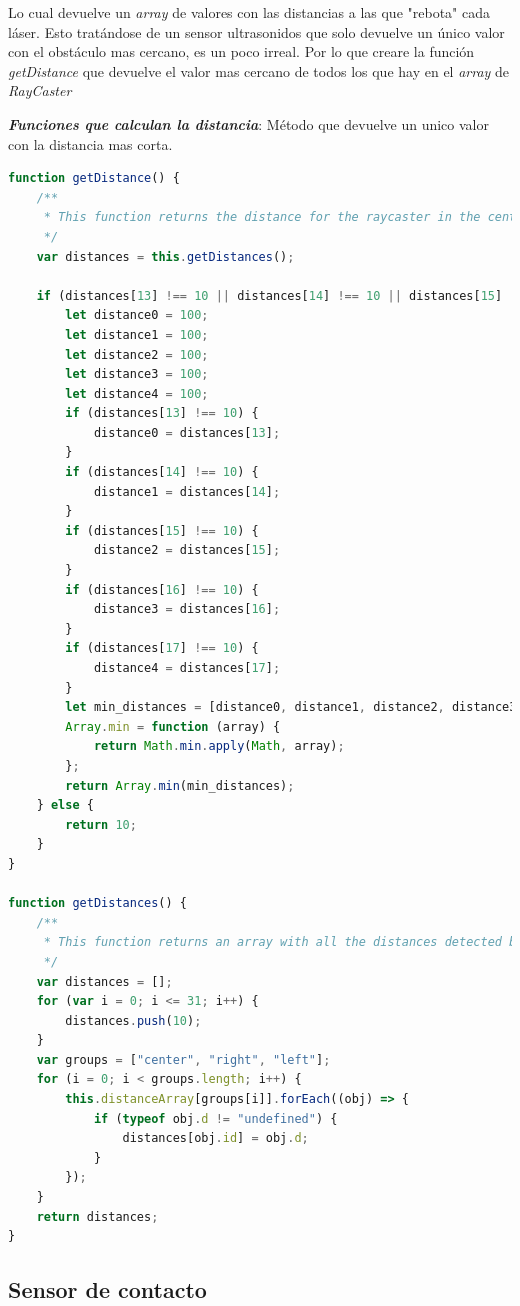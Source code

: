 Lo cual devuelve un \textit{array} de valores con las distancias a las que "rebota" cada láser. Esto tratándose de un sensor ultrasonidos que solo devuelve un único valor con el obstáculo mas cercano, es un poco irreal. Por lo que creare la función \textit{getDistance} que devuelve el valor mas cercano de todos los que hay en el \textit{array} de \textit{RayCaster} 

\textit{\textbf{Funciones que calculan la distancia}}: Método que devuelve  un unico valor con la distancia mas corta. 

 \begin{lstlisting}[language=javascript]
function getDistance() {
    /**
     * This function returns the distance for the raycaster in the center of the arc of rays.
     */
    var distances = this.getDistances();

    if (distances[13] !== 10 || distances[14] !== 10 || distances[15] !== 10 || distances[16] !== 10 || distances[17] !== 10) {
        let distance0 = 100;
        let distance1 = 100;
        let distance2 = 100;
        let distance3 = 100;
        let distance4 = 100;
        if (distances[13] !== 10) {
            distance0 = distances[13];
        }
        if (distances[14] !== 10) {
            distance1 = distances[14];
        }
        if (distances[15] !== 10) {
            distance2 = distances[15];
        }
        if (distances[16] !== 10) {
            distance3 = distances[16];
        }
        if (distances[17] !== 10) {
            distance4 = distances[17];
        }
        let min_distances = [distance0, distance1, distance2, distance3, distance4];
        Array.min = function (array) {
            return Math.min.apply(Math, array);
        };
        return Array.min(min_distances);
    } else {
        return 10;
    }
}

function getDistances() {
    /**
     * This function returns an array with all the distances detected by the rays.
     */
    var distances = [];
    for (var i = 0; i <= 31; i++) {
        distances.push(10);
    }
    var groups = ["center", "right", "left"];
    for (i = 0; i < groups.length; i++) {
        this.distanceArray[groups[i]].forEach((obj) => {
            if (typeof obj.d != "undefined") {
                distances[obj.id] = obj.d;
            }
        });
    }
    return distances;
}
\end{lstlisting}

\subsection{Sensor de contacto}

